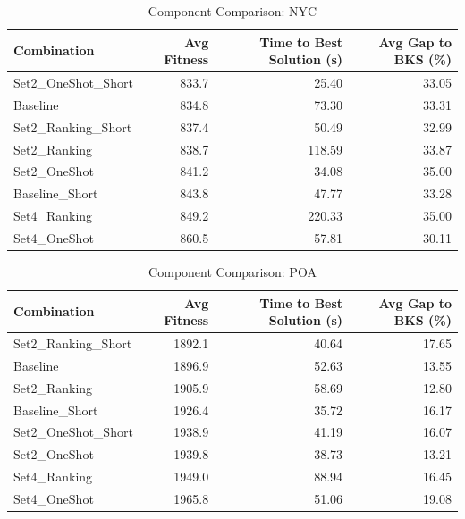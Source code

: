 \documentclass{article}
\begin{document}
\begin{table}[htbp]
\centering
\caption{Component Comparison: NYC}
\label{tab:comparison_nyc}
\begin{tabular}{lrrr}
\toprule
Combination & Avg Fitness & Time to Best Solution (s) & Avg Gap to BKS (\%) \\
\midrule
Set2\_OneShot\_Short & 833.7 & 25.40 & 33.05 \\
Baseline & 834.8 & 73.30 & 33.31 \\
Set2\_Ranking\_Short & 837.4 & 50.49 & 32.99 \\
Set2\_Ranking & 838.7 & 118.59 & 33.87 \\
Set2\_OneShot & 841.2 & 34.08 & 35.00 \\
Baseline\_Short & 843.8 & 47.77 & 33.28 \\
Set4\_Ranking & 849.2 & 220.33 & 35.00 \\
Set4\_OneShot & 860.5 & 57.81 & 30.11 \\
\bottomrule
\end{tabular}
\end{table}

\begin{table}[htbp]
\centering
\caption{Component Comparison: POA}
\label{tab:comparison_poa}
\begin{tabular}{lrrr}
\toprule
Combination & Avg Fitness & Time to Best Solution (s) & Avg Gap to BKS (\%) \\
\midrule
Set2\_Ranking\_Short & 1892.1 & 40.64 & 17.65 \\
Baseline & 1896.9 & 52.63 & 13.55 \\
Set2\_Ranking & 1905.9 & 58.69 & 12.80 \\
Baseline\_Short & 1926.4 & 35.72 & 16.17 \\
Set2\_OneShot\_Short & 1938.9 & 41.19 & 16.07 \\
Set2\_OneShot & 1939.8 & 38.73 & 13.21 \\
Set4\_Ranking & 1949.0 & 88.94 & 16.45 \\
Set4\_OneShot & 1965.8 & 51.06 & 19.08 \\
\bottomrule
\end{tabular}
\end{table}
\end{document}
